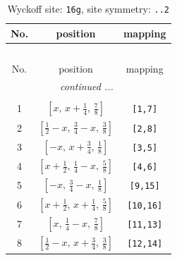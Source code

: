 \documentclass[fleqn,8pt]{jsarticle}
\begin{document}
\renewcommand{\arraystretch}{1.2}
\begin{longtable}{ccc}
\caption{Wyckoff site: {\tt 16g}, site symmetry: {\tt ..2}}
 \\
 \hline \hline
No. & position & mapping \\ \hline \endfirsthead

\multicolumn{2}{l}{\tablename\ \thetable{}} \\
 \hline \hline
No. & position & mapping \\ \hline \endhead

 \hline \hline
\multicolumn{2}{r}{\footnotesize\it continued ...} \\ \endfoot

 \hline \hline
\multicolumn{2}{r}{} \\ \endlastfoot

1 & $\left[ x,\, x + \frac{1}{4},\, \frac{7}{8} \right]$ & {\tt [1,7]} \\ \hline
2 & $\left[ \frac{1}{2} - x,\, \frac{3}{4} - x,\, \frac{3}{8} \right]$ & {\tt [2,8]} \\ \hline
3 & $\left[ - x,\, x + \frac{3}{4},\, \frac{1}{8} \right]$ & {\tt [3,5]} \\ \hline
4 & $\left[ x + \frac{1}{2},\, \frac{1}{4} - x,\, \frac{5}{8} \right]$ & {\tt [4,6]} \\ \hline
5 & $\left[ - x,\, \frac{3}{4} - x,\, \frac{1}{8} \right]$ & {\tt [9,15]} \\ \hline
6 & $\left[ x + \frac{1}{2},\, x + \frac{1}{4},\, \frac{5}{8} \right]$ & {\tt [10,16]} \\ \hline
7 & $\left[ x,\, \frac{1}{4} - x,\, \frac{7}{8} \right]$ & {\tt [11,13]} \\ \hline
8 & $\left[ \frac{1}{2} - x,\, x + \frac{3}{4},\, \frac{3}{8} \right]$ & {\tt [12,14]} \\
\end{longtable}
\renewcommand{\arraystretch}{1.2}
\end{document}
